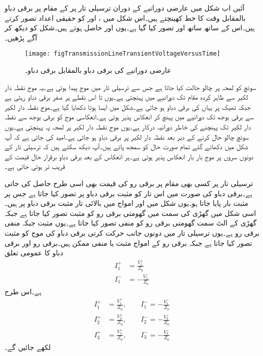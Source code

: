 آئیں اب شکل  میں عارضی دورانیے  کے دوران ترسیلی تار پر  کے مقام پر  برقی دباو بالمقابل وقت کا خط کھینچتے ہیں۔اس شکل میں ،  اور  کو حقیقی اعداد تصور کرتے ہیں۔اس کے ساتھ ساتھ  اور  تصور کیا گیا ہے۔یوں  اور  حاصل ہوتے ہیں۔شکل  کو دیکھ کر آگے پڑھیں۔
\begin{figure}
\centering
\texttt{[image: figTransmissionLineTransientVoltageVersusTime]}
\caption{عارضی دورانیے کی برقی دباو بالمقابل برقی دباو۔}
\label{شکل_ترسیلی_عارضی_برقی_دباو_بالمقابل_وقت}
\end{figure}

 سوئچ کو لمحہ  پر چالو حالت کیا جاتا ہے جس سے ترسیلی تار میں  موج پیدا ہوتی ہے۔یہ موج نقطہ دار لکیر سے ظاہر کردہ مقام تک  دورانیے میں پہنچتی ہے۔یوں  تا  اس نقطے پر صفر برقی دباو رہتی ہے جبکہ ٹھیک  پر یہاں کی برقی دباو  ہو جاتی ہے۔شکل  میں ایسا ہوتا دکھایا گیا ہے۔موج  نقطہ دار لکیر سے برقی بوجھ تک  دورانیے میں پہنچ کر انعکاس پذیر ہوتی ہے۔انعکاسی موج کو برقی بوجھ سے نقطہ دار لکیر تک پہنچنے کی خاطر  دورانیہ درکار ہے۔یوں  موج نقطہ دار لکیر پر لمحہ  پہ پہنچتی ہے۔یوں سوئچ چالو حال کرنے کے  دیر بعد نقطہ دار لکیر پر برقی دباو  ہو جاتی ہے۔امید کی جاتی ہے کہ آپ شکل  میں دکھائے گئے تمام صورت حال کو سمجھ پائے ہیں۔آپ دیکھ سکتے ہیں کہ ترسیلی تار کے دونوں سروں پر موج بار بار انعکاس پذیر ہوتی ہے۔ہر انعکاس کے بعد برقی دباو برقرار حال قیمت کے قریب تر ہوتی جاتی ہے۔

ترسیلی تار پر کسی بھی مقام پر برقی رو کی قیمت بھی اسی طرح حاصل کی جاتی ہے۔برقی دباو کی صورت میں اس تار کو مثبت برقی دباو پر تصور کیا جاتا ہے جس پر مثبت بار پایا جاتا ہو۔یوں شکل  میں  اور  امواج میں بالائی تار مثبت برقی دباو پر ہیں۔اسی شکل میں گھڑی کی سمت میں گھومتی برقی رو کو مثبت تصور کیا جاتا ہے جبکہ گھڑی کے الٹ سمت گھومتی برقی رو کو منفی تصور کیا جاتا ہے۔یوں  مثبت جبکہ  منفی برقی رو ہے۔یوں ترسیلی تار میں دونوں جانب حرکت کرتی برقی دباو کی موج کو مثبت تصور کیا جاتا ہے جبکہ برقی رو کے امواج مثبت یا منفی ممکن ہیں۔برقی رو اور برقی دباو کا عمومی تعلق
\begin{align*}
I_1^+&=\frac{V_1^+}{Z_0}\\
I_1^-&=-\frac{V_1^-}{Z_0}
\end{align*}
ہے۔اس طرح 
\begin{align*}
I_1^+&=\frac{V_1^+}{Z_0} , \quad \quad I_1^-=-\frac{V_1^-}{Z_0}\\
I_2^+&=\frac{V_2^+}{Z_0} , \quad \quad I_2^-=-\frac{V_2^-}{Z_0}\\
I_3^+&=\frac{V_3^+}{Z_0} , \quad \quad  I_3^-=-\frac{V_3^-}{Z_0}
\end{align*} 
لکھے جائیں گے۔

